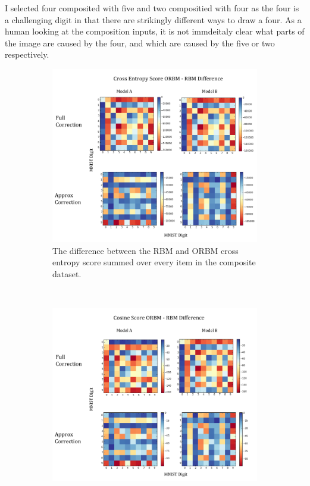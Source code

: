   I selected four composited with five and two compositied with four as the four is a challenging digit in that there are strikingly different ways to draw a four. As a human looking at the composition inputs, it is not immdeitaly clear what parts of the image are caused by the four, and which are caused by the five or two respectively.


  \begin{figure}[h]
  \centering
  \begin{subfigure}[t]{0.45\textwidth}
      \includegraphics[width=\textwidth]{Assets/Cross-Entropy-Score.png}
      \caption{The difference between the RBM and ORBM cross entropy score summed over every item in the composite dataset.}
      \label{F:Cross-Entropy-MNIST}
  \end{subfigure}
  ~ %
  \begin{subfigure}[t]{0.45\textwidth}
      \includegraphics[width=\textwidth]{Assets/Cosine-Score.png}

\end{subfigure}
\end{figure}
